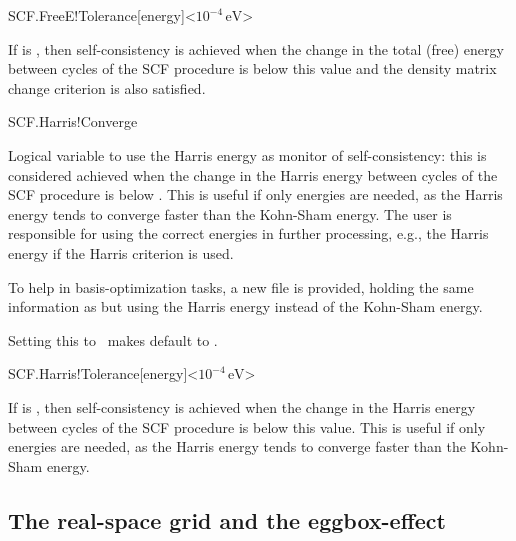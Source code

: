 \begin{fdfentry}{SCF.FreeE!Tolerance}[energy]<$10^{-4}\,\mathrm{eV}$>

  If  is \fdftrue, then self-consistency is
  achieved when the change in the total (free) energy between cycles
  of the SCF procedure is below this value and the density matrix
  change criterion is also satisfied.

\end{fdfentry}

\begin{fdflogicalF}{SCF.Harris!Converge}

  Logical variable to use the Harris energy as monitor of
  self-consistency: this is considered achieved when the change in the
  Harris energy between cycles of the SCF procedure is below
  . This is useful if only
  energies are needed, as the Harris energy tends to converge faster
  than the Kohn-Sham energy. The user is responsible for using the
  correct energies in further processing, e.g., the Harris energy if
  the Harris criterion is used.

  To help in basis-optimization tasks, a new file
   is provided, holding the same
  information as  but using the Harris energy
  instead of the Kohn-Sham energy.

  \note Setting this to \fdftrue\ makes 
   default to \fdffalse.

\end{fdflogicalF}

\begin{fdfentry}{SCF.Harris!Tolerance}[energy]<$10^{-4}\,\mathrm{eV}$>

  If  is \fdftrue, then self-consistency is
  achieved when the change in the Harris energy between cycles of the
  SCF procedure is below this value. This is useful if only energies
  are needed, as the Harris energy tends to converge faster than the
  Kohn-Sham energy.
  
\end{fdfentry}



\vspace{5pt}
\subsection{The real-space grid and the eggbox-effect}

